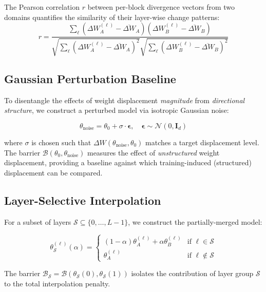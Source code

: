 \documentclass[11pt,a4paper]{article}
\begin{document}
The Pearson correlation $r$ between per-block divergence vectors from two domains quantifies the similarity of their layer-wise change patterns:
\begin{equation}
r = \frac{\sum_{\ell} (\Delta W_A^{(\ell)} - \overline{\Delta W}_A)(\Delta W_B^{(\ell)} - \overline{\Delta W}_B)}{\sqrt{\sum_{\ell}(\Delta W_A^{(\ell)} - \overline{\Delta W}_A)^2} \sqrt{\sum_{\ell}(\Delta W_B^{(\ell)} - \overline{\Delta W}_B)^2}}
\end{equation}

\subsection{Gaussian Perturbation Baseline}

To disentangle the effects of weight displacement \emph{magnitude} from \emph{directional structure}, we construct a perturbed model via isotropic Gaussian noise:

\begin{equation}\label{eq:gaussian}
\theta_{\text{noise}} = \theta_0 + \sigma \cdot \bm{\epsilon}, \quad \bm{\epsilon} \sim \mathcal{N}(0, \mathbf{I}_d)
\end{equation}

where $\sigma$ is chosen such that $\Delta W(\theta_{\text{noise}}, \theta_0)$ matches a target displacement level. The barrier $\mathcal{B}(\theta_0, \theta_{\text{noise}})$ measures the effect of \emph{unstructured} weight displacement, providing a baseline against which training-induced (structured) displacement can be compared.

\subsection{Layer-Selective Interpolation}

For a subset of layers $\mathcal{S} \subseteq \{0, \dots, L-1\}$, we construct the partially-merged model:

\begin{equation}\label{eq:layersel}
\theta^{(\ell)}_{\mathcal{S}}(\alpha) = \begin{cases}
(1 - \alpha) \theta_A^{(\ell)} + \alpha \theta_B^{(\ell)} & \text{if } \ell \in \mathcal{S} \\[4pt]
\theta_A^{(\ell)} & \text{if } \ell \notin \mathcal{S}
\end{cases}
\end{equation}

The barrier $\mathcal{B}_{\mathcal{S}} = \mathcal{B}(\theta_{\mathcal{S}}(0), \theta_{\mathcal{S}}(1))$ isolates the contribution of layer group $\mathcal{S}$ to the total interpolation penalty.
\end{document}
